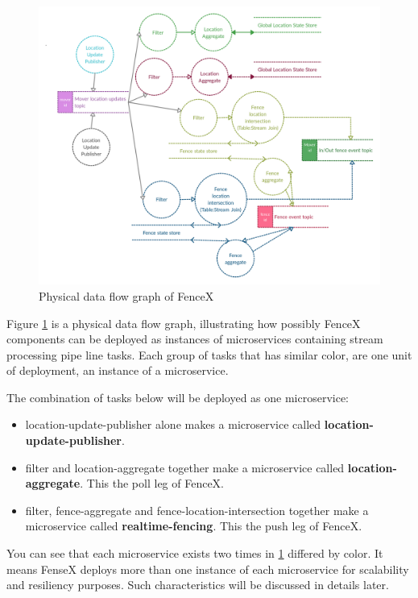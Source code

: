 \documentclass[a4]{report}
\begin{document}
    \begin{figure}[ht]
        \caption{Physical data flow graph of FenceX}
        \label{fig:physical-dfg}
        \includegraphics[scale=0.2]{images/physical-data-flow-diagram.png}
       
    \end{figure}

    Figure \ref{fig:physical-dfg} is a physical data flow graph, illustrating how possibly FenceX components can be deployed as instances of microservices containing stream processing pipe line tasks. Each group of tasks that has similar color, are one unit of deployment, an instance of a microservice.

    The combination of tasks below will be deployed as one microservice:
    \begin{itemize}
        \item{location-update-publisher} alone makes a microservice called \textbf{location-update-publisher}.
        \item{filter and location-aggregate} together make a microservice called \textbf{location-aggregate}. This the poll leg of FenceX.
        \item{filter, fence-aggregate and fence-location-intersection} together make a microservice called \textbf{realtime-fencing}. This the push leg of FenceX.
    \end{itemize}

    You can see that each microservice exists two times in \ref{fig:physical-dfg} differed by color. It means FenseX deploys more than one instance of each microservice for scalability and resiliency purposes.
    Such characteristics will be discussed in details later.
\end{document}
